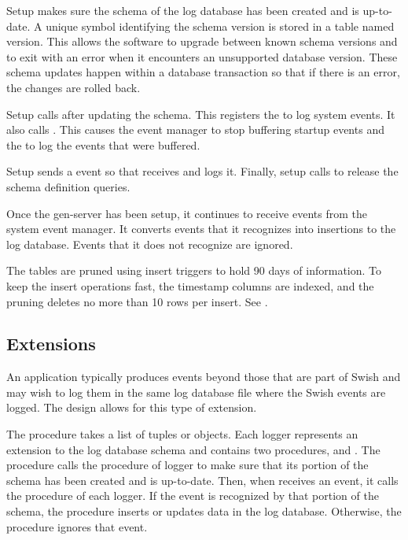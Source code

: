 Setup makes sure the schema of the log database has been created and
is up-to-date. A unique symbol identifying the schema version is
stored in a table named version. This allows the software to upgrade
between known schema versions and to exit with an error when it
encounters an unsupported database version. These schema updates
happen within a database transaction so that if there is an error, the
changes are rolled back.

Setup calls  after updating the
schema. This registers the  to log system events. It
also calls . This causes the event
manager to stop buffering startup events and the  to
log the events that were buffered.

Setup sends a  event so that 
receives and logs it. Finally, setup calls  to
release the schema definition queries.

Once the  gen-server has been setup, it continues to
receive events from the system event manager. It converts events that
it recognizes into insertions to the log database. Events that it does
not recognize are ignored.

The tables are pruned using insert triggers to hold 90 days of
information. To keep the insert operations fast, the timestamp columns
are indexed, and the pruning deletes no more than 10 rows per insert.
See \hyperref[make-swish-event-logger]{}.

\subsection {Extensions}

An application typically produces events beyond those that are part of
Swish and may wish to log them in the same log database file where the
Swish events are logged. The  design allows for this
type of extension.

The  procedure takes a list of
 tuples or  objects.
Each logger represents an extension
to the log database schema and contains two procedures, 
and . The  procedure calls the
 procedure of logger to make sure that its portion of
the schema has been created and is up-to-date. Then, when
 receives an event, it calls the  procedure
of each logger. If the event is recognized by that portion of the
schema, the  procedure inserts or updates data in the log
database. Otherwise, the procedure ignores that event.

